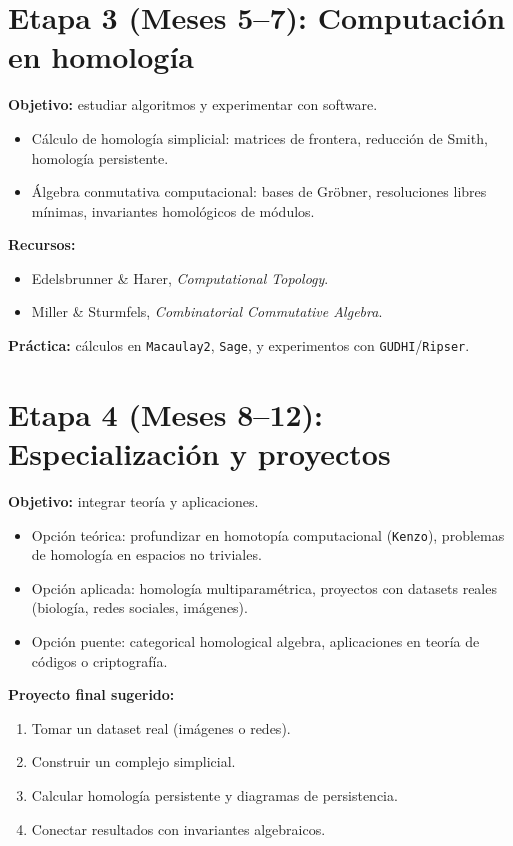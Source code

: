 \documentclass[12pt]{article}
\begin{document}
\section*{Etapa 3 (Meses 5--7): Computación en homología}
\textbf{Objetivo:} estudiar algoritmos y experimentar con software.
\begin{itemize}
    \item Cálculo de homología simplicial: matrices de frontera, reducción de Smith, homología persistente.
    \item Álgebra conmutativa computacional: bases de Gröbner, resoluciones libres mínimas, invariantes homológicos de módulos.
\end{itemize}
\textbf{Recursos:}
\begin{itemize}
    \item Edelsbrunner \& Harer, \textit{Computational Topology}.
    \item Miller \& Sturmfels, \textit{Combinatorial Commutative Algebra}.
\end{itemize}
\textbf{Práctica:} cálculos en \texttt{Macaulay2}, \texttt{Sage}, y experimentos con \texttt{GUDHI}/\texttt{Ripser}.

\section*{Etapa 4 (Meses 8--12): Especialización y proyectos}
\textbf{Objetivo:} integrar teoría y aplicaciones.
\begin{itemize}
    \item Opción teórica: profundizar en homotopía computacional (\texttt{Kenzo}), problemas de homología en espacios no triviales.
    \item Opción aplicada: homología multiparamétrica, proyectos con datasets reales (biología, redes sociales, imágenes).
    \item Opción puente: categorical homological algebra, aplicaciones en teoría de códigos o criptografía.
\end{itemize}
\textbf{Proyecto final sugerido:}
\begin{enumerate}
    \item Tomar un dataset real (imágenes o redes).
    \item Construir un complejo simplicial.
    \item Calcular homología persistente y diagramas de persistencia.
    \item Conectar resultados con invariantes algebraicos.
\end{enumerate}
\end{document}
